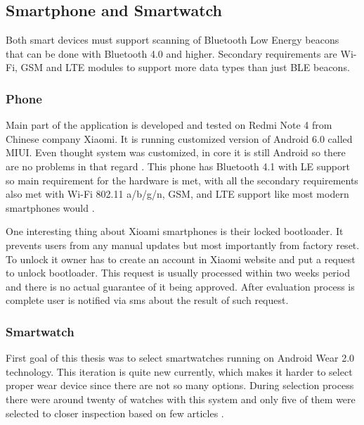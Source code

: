 \subsection{Smartphone and Smartwatch}\label{subsec:SmartphoneAndSmartWatch}
Both smart devices must support scanning of Bluetooth Low Energy beacons that can be done with Bluetooth 4.0 and higher. Secondary requirements are Wi-Fi, GSM and LTE modules to support more data types than just BLE beacons.

\subsubsection{Phone}\label{subsubsec:Phone}
Main part of the application is developed and tested on Redmi Note 4 from Chinese company Xiaomi. It is running customized version of Android 6.0 called MIUI. Even thought system was customized, in core it is still Android so there are no problems in that regard \cite{XRN4LTE}. This phone has Bluetooth 4.1 with LE support so main requirement for the hardware is met, with all the secondary requirements also met with Wi-Fi 802.11 a/b/g/n, GSM, and LTE support like most modern smartphones would \cite{XRN4FPS}.

One interesting thing about Xioami smartphones is their locked bootloader. It prevents users from any manual updates but most importantly from factory reset. To unlock it owner has to create an account in Xiaomi website and put a request to unlock bootloader. This request is usually processed within two weeks period and there is no actual guarantee of it being approved. After evaluation process is complete user is notified via sms about the result of such request.

\subsubsection{Smartwatch}\label{subsubsec:Smartwatch}
First goal of this thesis was to select smartwatches running on Android Wear 2.0 technology. This iteration is quite new currently, which makes it harder to select proper wear device since there are not so many options. During selection process there were around twenty of watches with this system and only five of them were selected to closer inspection based on few articles \cite{BAWW, BAWW18, BAWW17}.

